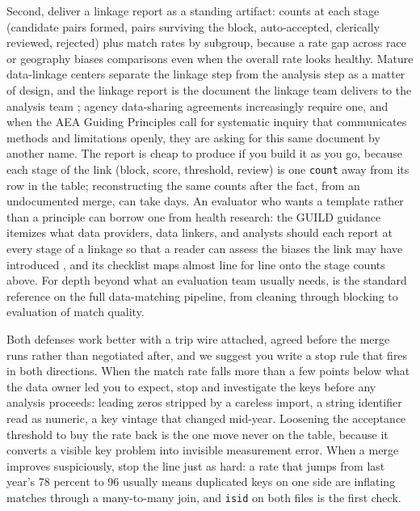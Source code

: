 \documentclass[
    a4paper,
    fontsize=10pt,
    twoside=true,
    numbers=noenddot,
]{kaobook}
\begin{document}
Second, deliver a linkage report as a standing artifact: counts at each stage (candidate pairs formed, pairs surviving the block, auto-accepted, clerically reviewed, rejected) plus match rates by subgroup, because a rate gap across race or geography biases comparisons even when the overall rate looks healthy. Mature data-linkage centers separate the linkage step from the analysis step as a matter of design, and the linkage report is the document the linkage team delivers to the analysis team \parencite{harron2017challenges}; agency data-sharing agreements increasingly require one, and when the AEA Guiding Principles call for systematic inquiry that communicates methods and limitations openly, they are asking for this same document by another name. The report is cheap to produce if you build it as you go, because each stage of the link (block, score, threshold, review) is one \texttt{count} away from its row in the table; reconstructing the same counts after the fact, from an undocumented merge, can take days. An evaluator who wants a template rather than a principle can borrow one from health research: the GUILD guidance itemizes what data providers, data linkers, and analysts should each report at every stage of a linkage so that a reader can assess the biases the link may have introduced \parencite{gilbert2018guild}, and its checklist maps almost line for line onto the stage counts above. For depth beyond what an evaluation team usually needs, \textcite{christen2012matching} is the standard reference on the full data-matching pipeline, from cleaning through blocking to evaluation of match quality.

Both defenses work better with a trip wire attached, agreed before the merge runs rather than negotiated after, and we suggest you write a stop rule that fires in both directions. When the match rate falls more than a few points below what the data owner led you to expect, stop and investigate the keys before any analysis proceeds: leading zeros stripped by a careless import, a string identifier read as numeric, a key vintage that changed mid-year. Loosening the acceptance threshold to buy the rate back is the one move never on the table, because it converts a visible key problem into invisible measurement error. When a merge improves suspiciously, stop the line just as hard: a rate that jumps from last year's 78 percent to 96 usually means duplicated keys on one side are inflating matches through a many-to-many join, and \texttt{isid} on both files is the first check.
\end{document}
